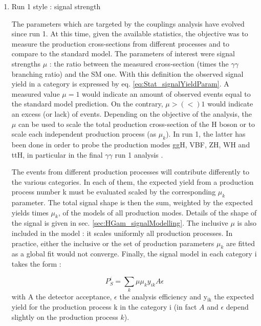 \begin{enumerate}
\item Run 1 style : signal strength
\label{sec:org84ab396}
\label{sec:HGam_signalStrength}

The parameters which are targeted by the couplings analysis have evolved since run 1.
At this time, given the available statistics, the objective was to measure the production cross-sections from different processes and to compare to the standard model.
The parameters of interest were signal strengths $\mu$ : the ratio between the measured cross-section (times the \(\gamma\gamma\) branching ratio) and the SM one.
With this definition the observed signal yield in a category is expressed by eq. \ref{eq:Stat_signalYieldParam}.
A measured value $\mu=1$ would indicate an amount of observed events equal to the standard model prediction.
On the contrary, $\mu>(<)1$ would indicate an excess (or lack) of events.
Depending on the objective of the analysis, the $\mu$ can be used to scale the total production cross-section of the H boson or to scale each independent production process (as $\mu_k$).
In run 1, the latter has been done in order to probe the production modes ggH, VBF, ZH, WH and ttH, in particular in the final \(\gamma\gamma\) run 1 analysis \cite{CERN-PH-EP-2014-198}.


The events from different production processes will contribute differently to the various categories.
In each of them, the expected yield from a production process number k must be evaluated scaled by the corresponding $\mu_k$ parameter.
The total signal shape is then the sum, weighted by the expected yields times $\mu_k$, of the models of all production modes.
Details of the shape of the signal is given in sec. \ref{sec:HGam_signalModelling}.
The inclusive $\mu$ is also included in the model : it scales uniformly all production processes.
In practice, either the inclusive or the set of production parameters $\mu_k$ are fitted as a global fit would not converge.
Finally, the signal model in each category i takes the form :

\begin{equation}
  P_S^i = \sum\limits_{k} \mu \mu_{k} y_{ik} A \epsilon
  \label{eq:Stat_signalYieldParam}
\end{equation}
with A the detector acceptance, \(\epsilon\) the analysis efficiency and y\(_{\text{ik}}\) the expected yield for the production process k in the category i (in fact $A$ and $\epsilon$ depend slightly on the production process $k$).


\end{enumerate}
